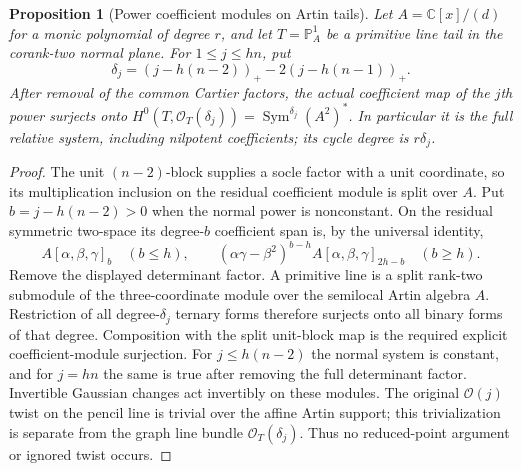 \documentclass[11pt,reqno]{amsart}
\numberwithin{equation}{section}
\newtheorem{proposition}[theorem]{Proposition}
\theoremstyle{definition}\newtheorem{definition}[theorem]{Definition}
\theoremstyle{remark}\newtheorem{remark}[theorem]{Remark}
\newcommand{\C}{\mathbb C}\newcommand{\Q}{\mathbb Q}
\newcommand{\Pj}{\mathbb P}\newcommand{\A}{\mathbb A}
\newcommand{\OO}{\mathcal O}\newcommand{\II}{\mathcal I}
\DeclareMathOperator{\Sym}{Sym}\DeclareMathOperator{\Gr}{Gr}
\begin{document}
\begin{proposition}[Power coefficient modules on Artin tails]
\label{prop:Artin-powers-v162}
Let $A=\C[x]/(d)$ for a monic polynomial of degree $r$, and let
$T=\Pj^1_A$ be a primitive line tail in the corank-two normal plane.
For $1\leq j\leq hn$, put
\[
 \delta_j=(j-h(n-2))_+-2(j-h(n-1))_+.
\]
After removal of the common Cartier factors, the actual coefficient
map of the $j$th power surjects onto
$H^0(T,\OO_T(\delta_j))=\Sym^{\delta_j}(A^2)^*$.
In particular it is the full relative system, including nilpotent
coefficients; its cycle degree is $r\delta_j$.
\end{proposition}
\begin{proof}
The unit $(n-2)$-block supplies a socle factor with a unit coordinate,
so its multiplication inclusion on the residual coefficient module
is split over $A$. Put $b=j-h(n-2)>0$ when the normal power is
nonconstant. On the residual symmetric two-space its degree-$b$
coefficient span is, by the universal identity,
\[
 A[\alpha,\beta,\gamma]_b\quad(b\leq h),\qquad
 (\alpha\gamma-\beta^2)^{b-h}
                 A[\alpha,\beta,\gamma]_{2h-b}\quad(b\geq h).
\]
Remove the displayed determinant factor. A primitive line is a
split rank-two submodule of the three-coordinate module over the
semilocal Artin algebra $A$. Restriction of all degree-$\delta_j$
ternary forms therefore surjects onto all binary forms of that
degree. Composition with the split unit-block map is the required
explicit coefficient-module surjection. For $j\leq h(n-2)$ the
normal system is constant, and for $j=hn$ the same is true after
removing the full determinant factor. Invertible Gaussian changes
act invertibly on these modules. The original $\OO(j)$ twist on
the pencil line is trivial over the affine Artin support; this
trivialization is separate from the graph line bundle $\OO_T(\delta_j)$.
Thus no reduced-point argument or ignored twist occurs.
\end{proof}
\end{document}
